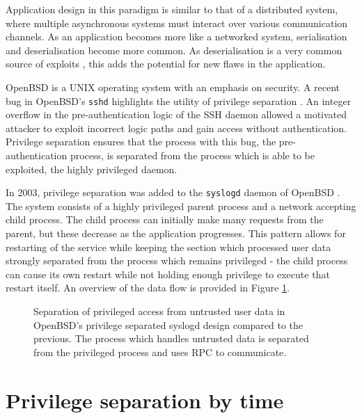 \documentclass[12pt,a4paper,twoside]{report}
\begin{document}
Application design in this paradigm is similar to that of a distributed system, where multiple asynchronous systems must interact over various communication channels. As an application becomes more like a networked system, serialisation and deserialisation become more common. As deserialisation is a very common source of exploits \citep{the_mitre_corporation_deserialization_2006}, this adds the potential for new flaws in the application.

OpenBSD is a UNIX operating system with an emphasis on security. A recent bug in OpenBSD's \texttt{sshd} highlights the utility of privilege separation \citep{the_openbsd_foundation_openssh_2022}. An integer overflow in the pre-authentication logic of the SSH daemon allowed a motivated attacker to exploit incorrect logic paths and gain access without authentication. Privilege separation ensures that the process with this bug, the pre-authentication process, is separated from the process which is able to be exploited, the highly privileged daemon.

In 2003, privilege separation was added to the \texttt{syslogd} daemon of OpenBSD \citep{madhavapeddy_privsepc_2003}. The system consists of a highly privileged parent process and a network accepting child process. The child process can initially make many requests from the parent, but these decrease as the application progresses. This pattern allows for restarting of the service while keeping the section which processed user data strongly separated from the process which remains privileged - the child process can cause its own restart while not holding enough privilege to execute that restart itself. An overview of the data flow is provided in Figure \ref{fig:openbsd-syslogd-privsep}.

\begin{figure}
    \centering
    
    
    \caption{Separation of privileged access from untrusted user data in OpenBSD's privilege separated syslogd design compared to the previous. The process which handles untrusted data is separated from the privileged process and uses RPC to communicate.}
    \label{fig:openbsd-syslogd-privsep}
\end{figure}

\section{Privilege separation by time}
\label{sec:priv-sep-time}
\end{document}
